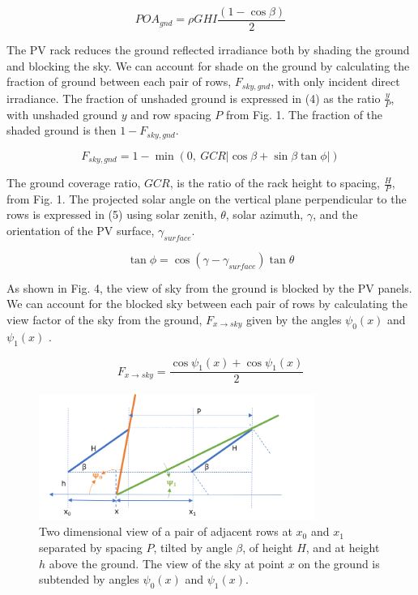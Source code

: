 \documentclass[conference]{IEEEtran}
\begin{document}
\begin{equation}
POA_{gnd} = \rho GHI \frac{\left(1-\cos \beta \right)}{2}
\end{equation}

The PV rack reduces the ground reflected irradiance both by shading the ground and blocking the sky.  We can account for shade on the ground by calculating the fraction of ground between each pair of rows, $F_{sky,gnd}$, with only incident direct irradiance. The fraction of unshaded ground is expressed in (4) as the ratio $\frac{y}{P}$, with unshaded ground $y$ and row spacing $P$ from Fig. 1.  The fraction of the shaded ground is then $1-F_{sky,gnd}$.

\begin{equation}
F_{sky,gnd} = 1 - \min(0,\ GCR \left| \cos \beta + \sin \beta \tan \phi \right|)
\end{equation}

The ground coverage ratio, $GCR$, is the ratio of the rack height to spacing, $\frac{H}{P}$, from Fig. 1.  The projected solar angle on the vertical plane perpendicular to the rows is expressed in (5) using solar zenith, $\theta$, solar azimuth, $\gamma$, and the orientation of the PV surface, $\gamma_{surface}$.

\begin{equation}
\tan \phi = \cos \left(\gamma - \gamma_{surface} \right) \tan \theta
\end{equation}

As shown in Fig. 4, the view of sky from the ground is blocked by the PV panels.  We can account for the blocked sky between each pair of rows by calculating the view factor of the sky from the ground, $F_{x \rightarrow sky}$ given by the angles $\psi_0(x)$ and $\psi_1\left(x\right)$ \cite{Marion2017}.

\begin{equation}
F_{x \rightarrow sky} = \frac{\cos \psi_1\left(x \right) + \cos \psi_1\left(x \right)}{2}
\end{equation}

\begin{figure}
\centering
\includegraphics[width=9cm]{ground_sky_vf.png}
\caption{Two dimensional view of a pair of adjacent rows at $x_0$ and $x_1$ separated by spacing $P$, tilted by angle $\beta$, of height $H$, and at height $h$ above the ground.  The view of the sky at point $x$ on the ground is subtended by angles $\psi_0(x)$ and $\psi_1\left(x\right)$.}
\end{figure}
\end{document}
